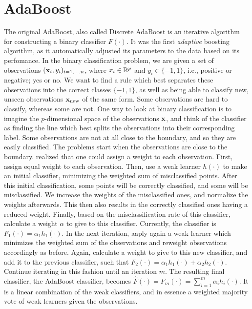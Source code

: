 \section{AdaBoost}
The original AdaBoost, also called Discrete AdaBoost \citep{adaboost} is an iterative algorithm for constructing a binary classifier $F(\cdot)$. It was the first \textit{adaptive} boosting algorithm, as it automatically adjusted its parameters to the data based on its perfomance. In the binary classification problem, we are given a set of observations $(\mathbf{x}_i,y_i)_{i=1,\ldots,n}$, where $x_i\in\mathbb{R}^p$ and $y_i\in\{-1,1\}$, i.e., positive or negative; yes or no. We want to find a rule which best separates these observations into the correct classes $\{-1,1\}$, as well as being able to classify new, unseen observations $\mathbf{x}_{\text{new}}$ of the same form. Some observations are hard to classify, whereas some are not. One way to look at binary classification is to imagine the $p$-dimensional space of the observations $\mathbf{x}$, and think of the classifier as finding the line which best splits the observations into their corresponding label. Some observations are not at all close to the boundary, and so they are easily classified. The problems start when the observations are close to the boundary. \citet{adaboost} realized that one could assign a weight to each observation. First, assign equal weight to each observation. Then, use a weak learner $h(\cdot)$ to make an initial classifier, minimizing the weighted sum of misclassified points. After this initial classification, some points will be correctly classified, and some will be misclassified. We increase the weights of the misclassified ones, and normalize the weights afterwards. This then also results in the correctly classified ones having a reduced weight. Finally, based on the misclassification rate of this classifier, calculate a weight $\alpha$ to give to this classifier. Currently, the classifier is $F_1(\cdot)=\alpha_1h_1(\cdot).$ In the next iteration, aaply again a weak learner which minimizes the weighted sum of the observations and reweight observations accordingly as before. Again, calculate a weight to give to this new classifier, and add it to the previous classifier, such that $F_2(\cdot)=\alpha_1h_1(\cdot)+\alpha_2h_2(\cdot)$. Continue iterating in this fashion until an iteration $m$. The resulting final classifier, the AdaBoost classifier, becomes $\hat{F}(\cdot)=F_m(\cdot)=\sum_{i=1}^m\alpha_ih_i(\cdot)$. It is a linear combination of the weak classifiers, and in essence a weighted majority vote of weak learners given the observations.

